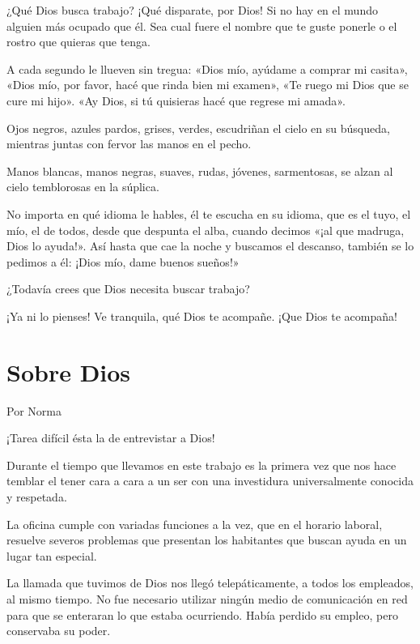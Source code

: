 \documentclass[11pt,twoside,openright,a5paper]{book}
\begin{document}
¿Qué Dios busca trabajo? ¡Qué disparate, por Dios! Si no hay en el mundo alguien más ocupado que él. Sea cual fuere el nombre que te guste ponerle o el rostro que quieras que tenga.

A  cada segundo le llueven sin tregua: «Dios mío, ayúdame a comprar mi casita», «Dios mío, por favor, hacé que rinda bien mi examen», «Te ruego mi Dios que se cure mi hijo». «Ay Dios, si tú quisieras hacé que regrese mi amada».

Ojos negros, azules pardos, grises, verdes, escudriñan el cielo en su búsqueda, mientras juntas con fervor las manos en el pecho.

Manos blancas, manos negras, suaves, rudas, jóvenes, sarmentosas, se alzan al cielo temblorosas en la súplica.

No importa en qué idioma le hables, él te escucha en su idioma, que es el tuyo, el mío, el de todos, desde que despunta el alba, cuando decimos «¡al que madruga, Dios lo ayuda!». Así hasta que cae la noche y buscamos el descanso, también se lo pedimos a él: ¡Dios mío, dame buenos sueños!»

¿Todavía crees que Dios necesita buscar trabajo?

¡Ya ni lo pienses! Ve tranquila, qué Dios te acompañe. ¡Que Dios te acompaña!

\section*{Sobre Dios}
                                                                                                   \begin{flushright}Por Norma\end{flushright}


¡Tarea difícil ésta la de entrevistar a Dios! 

Durante el tiempo que llevamos en este trabajo es la primera vez que nos hace temblar el tener cara a cara a un ser con una investidura universalmente conocida y respetada.

La oficina cumple con variadas funciones a la vez, que en el horario laboral, resuelve severos problemas que presentan los habitantes que buscan ayuda en un lugar tan especial.

La llamada que tuvimos de Dios nos llegó telepáticamente, a todos los empleados, al mismo tiempo. No fue necesario utilizar ningún medio de comunicación en red para que se enteraran lo que estaba ocurriendo. Había perdido su empleo, pero conservaba su poder.
\end{document}
